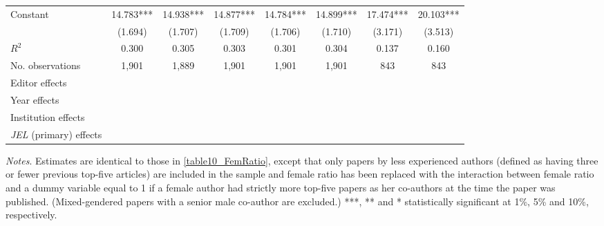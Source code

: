 \begin{table}
\begin{adjustwidth}{-0.085cm}{}
\begin{threeparttable}
\begin{tabular}{p{2.64cm}SSSSSSS}
            Constant                      &      14.783***&      14.938***&      14.877***&      14.784***&      14.899***&      17.474***&      20.103***\\
                                          &     (1.694)   &     (1.707)   &     (1.709)   &     (1.706)   &     (1.710)   &     (3.171)   &     (3.513)   \\
            \midrule
            \(R^2\)                       &       0.300   &       0.305   &       0.303   &       0.301   &       0.304   &       0.137   &       0.160   \\
            No. observations              &       1,901   &       1,889   &       1,901   &       1,901   &       1,901   &         843   &         843   \\
            \midrule
            Editor effects       &           {}   &           {}   &           {}   &           {}   &           {}   &           {}   &           {}   \\
            Year effects                  &           {}   &           {}   &           {}   &           {}   &           {}   &           {}   &           {}   \\
            Institution effects           &           {}   &           {}   &           {}   &           {}   &           {}   &           {}   &           {}   \\
            \textit{JEL} (primary) effects&               &               &               &               &               &               &           {}   \\
            \bottomrule
        \end{tabular}
        \begin{tablenotes}
            \tiny
            \item \textit{Notes}. Estimates are identical to those in \autoref{table10_FemRatio}, except that only papers by less experienced authors (defined as having three or fewer previous top-five articles) are included in the sample and female ratio has been replaced with the interaction between female ratio and a dummy variable equal to 1 if a female author had strictly more top-five papers as her co-authors at the time the paper was published. (Mixed-gendered papers with a senior male co-author are excluded.) ***, ** and * statistically significant at 1\%, 5\% and 10\%, respectively.
        \end{tablenotes}
    \end{threeparttable}
    \end{adjustwidth}
\end{table}